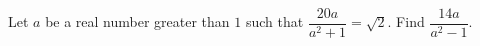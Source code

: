 Let $a$ be a real number greater than $1$ such that $\dfrac{20a}{a^2+1}=\sqrt2$. Find $\dfrac{14a}{a^2-1}$.
